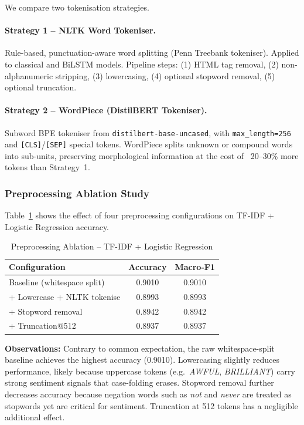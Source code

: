 We compare two tokenisation strategies.

\paragraph{Strategy 1 – NLTK Word Tokeniser.}
Rule-based, punctuation-aware word splitting (Penn Treebank tokeniser).
Applied to classical and BiLSTM models.
Pipeline steps: (1) HTML tag removal, (2) non-alphanumeric stripping,
(3) lowercasing, (4) optional stopword removal, (5) optional truncation.

\paragraph{Strategy 2 – WordPiece (DistilBERT Tokeniser).}
Subword BPE tokeniser from \texttt{distilbert-base-uncased}, with
\texttt{max\_length=256} and \texttt{[CLS]}/\texttt{[SEP]} special tokens.
WordPiece splits unknown or compound words into sub-units, preserving
morphological information at the cost of ~20--30\% more tokens than Strategy~1.

\subsubsection{Preprocessing Ablation Study}

Table~\ref{tab:q1_ablation} shows the effect of four preprocessing configurations
on TF-IDF + Logistic Regression accuracy.

\begin{table}[H]
  \centering
  \caption{Preprocessing Ablation -- TF-IDF + Logistic Regression}
  \label{tab:q1_ablation}
  \begin{tabular}{lcc}
    \toprule
    \textbf{Configuration} & \textbf{Accuracy} & \textbf{Macro-F1} \\
    \midrule
    Baseline (whitespace split)      & 0.9010 & 0.9010 \\
    + Lowercase + NLTK tokenise      & 0.8993 & 0.8993 \\
    + Stopword removal               & 0.8942 & 0.8942 \\
    + Truncation@512                 & 0.8937 & 0.8937 \\
    \bottomrule
  \end{tabular}
\end{table}

\noindent\textbf{Observations:}
Contrary to common expectation, the raw whitespace-split baseline achieves the highest
accuracy (0.9010). Lowercasing slightly reduces performance, likely because uppercase
tokens (e.g.\ \textit{AWFUL}, \textit{BRILLIANT}) carry strong sentiment signals that
case-folding erases. Stopword removal further decreases accuracy because negation words
such as \textit{not} and \textit{never} are treated as stopwords yet are critical for
sentiment. Truncation at 512 tokens has a negligible additional effect.

